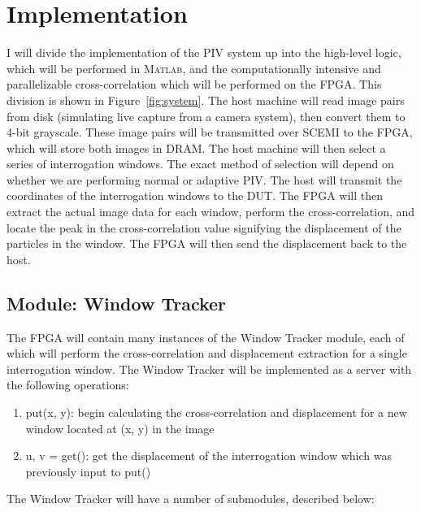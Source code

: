 \documentclass{article}
\begin{document}
	\section{Implementation}
	I will divide the implementation of the PIV system up into the high-level logic, which will be performed in \textsc{Matlab}, and the computationally intensive and parallelizable cross-correlation which will be performed on the FPGA. This division is shown in Figure~\ref{fig:system}. The host machine will read image pairs from disk (simulating live capture from a camera system), then convert them to 4-bit grayscale. These image pairs will be transmitted over SCEMI to the FPGA, which will store both images in DRAM. The host machine will then select a series of interrogation windows. The exact method of selection will depend on whether we are performing normal or adaptive PIV. The host will transmit the coordinates of the interrogation windows to the DUT. The FPGA will then extract the actual image data for each window, perform the cross-correlation, and locate the peak in the cross-correlation value signifying the displacement of the particles in the window. The FPGA will then send the displacement back to the host. 

	\subsection{Module: Window Tracker}
	The FPGA will contain many instances of the Window Tracker module, each of which will perform the cross-correlation and displacement extraction for a single interrogation window. The Window Tracker will be implemented as a server with the following operations: 
	\begin{enumerate}
		\item put(x, y): begin calculating the cross-correlation and displacement for a new window located at (x, y) in the image
		\item u, v = get(): get the displacement of the interrogation window which was previously input to put()
	\end{enumerate}
	The Window Tracker will have a number of submodules, described below:
\end{document}
